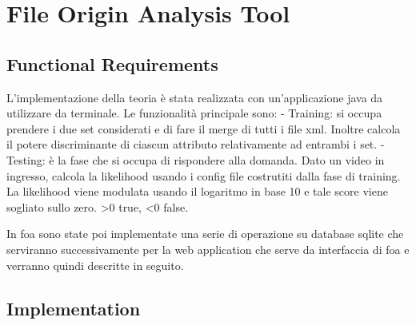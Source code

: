 \section{File Origin Analysis Tool}

\subsection{Functional Requirements}

L'implementazione della teoria è stata realizzata con un'applicazione java da utilizzare da terminale. Le funzionalità principale sono:
- Training: si occupa prendere i due set considerati e di fare il merge di tutti i file xml. Inoltre calcola il potere discriminante di ciascun attributo relativamente ad entrambi i set.
- Testing: è la fase che si occupa di rispondere alla domanda. Dato un video in ingresso, calcola la likelihood usando i config file costrutiti dalla fase di training. La likelihood viene modulata usando il logaritmo in base 10 e tale score viene sogliato sullo zero. >0 true, <0 false.

In foa sono state poi implementate una serie di operazione su database sqlite che serviranno successivamente per la web application che serve da interfaccia di foa e verranno quindi descritte in seguito.

\subsection{Implementation}

